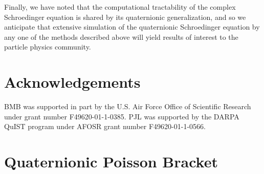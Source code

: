 \documentclass[a4paper,aps,prd,preprint,groupedaddress]{revtex4}
\begin{document}
Finally, we have noted that the computational tractability of the complex Schroedinger  equation is shared by its quaternionic generalization, and so we anticipate that extensive simulation of the quaternionic Schroedinger equation by any one of the methods described above will yield results of interest to the particle physics community.

\section*{Acknowledgements}

BMB was supported in part by the U.S. Air Force Office of Scientific Research under grant number F49620-01-1-0385. PJL was supported by the DARPA QuIST program under AFOSR grant number F49620-01-1-0566.

\appendix

\section{Quaternionic Poisson Bracket
\label{sec:app1}}
\end{document}
